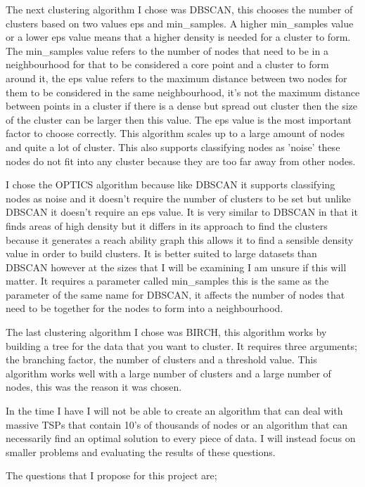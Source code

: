 The next clustering algorithm I chose was DBSCAN, this chooses the number of clusters based on two values eps and min\_samples. A higher min\_samples value or a lower eps value means that a higher density is needed for a cluster to form. The min\_samples value refers to the number of nodes that need to be in a neighbourhood for that to be considered a core point and a cluster to form around it, the eps value refers to the maximum distance between two nodes for them to be considered in the same neighbourhood, it's not the maximum distance between points in a cluster if there is a dense but spread out cluster then the size of the cluster can be larger then this value. The eps value is the most important factor to choose correctly. This algorithm scales up to a large amount of nodes and quite a lot of cluster. This also supports classifying nodes as 'noise' these nodes do not fit into any cluster because they are too far away from other nodes.

I chose the OPTICS algorithm because like DBSCAN it supports classifying nodes as noise and it doesn't require the number of clusters to be set but unlike DBSCAN it doesn't require an eps value. It is very similar to DBSCAN in that it finds areas of high density but it differs in its approach to find the clusters because it generates a reach ability graph this allows it to find a sensible density value in order to build clusters. It is better suited to large datasets than DBSCAN however at the sizes that I will be examining I am unsure if this will matter. It requires a parameter called min\_samples this is the same as the parameter of the same name for DBSCAN, it affects the number of nodes that need to be together for the nodes to form into a neighbourhood.

The last clustering algorithm I chose was BIRCH, this algorithm works by building a tree for the data that you want to cluster. It requires three arguments; the branching factor, the number of clusters and a threshold value. This algorithm works well with a large number of clusters and a large number of nodes, this was the reason it was chosen.

In the time I have I will not be able to create an algorithm that can deal with massive TSPs that contain 10's of thousands of nodes or an algorithm that can necessarily find an optimal solution to every piece of data. I will instead focus on smaller problems and evaluating the results of these questions.

The questions that I propose for this project are;


